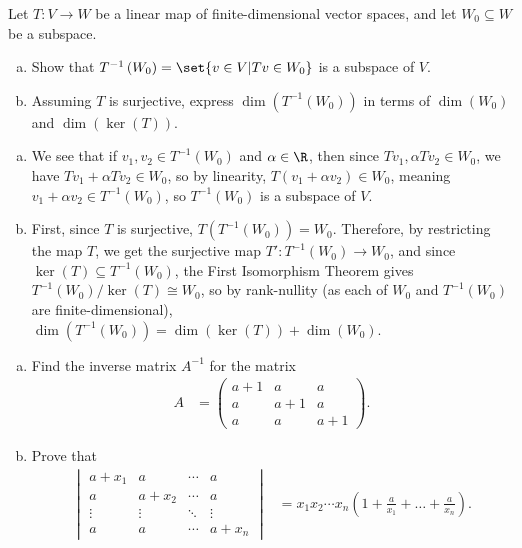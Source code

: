\documentclass[10pt]{mypackage}
\begin{document}
\begin{problem}
  Let $T\colon V\rightarrow W$ be a linear map of finite-dimensional vector spaces, and let $W_0\subseteq W$ be a subspace.
  \begin{enumerate}[(a)]
    \item Show that $T^{-1}\left( W_0 \right) = \set{v\in V | Tv\in W_0}$ is a subspace of $V$.
    \item Assuming $T$ is surjective, express $\dim \left( T^{-1}\left( W_0 \right) \right)$ in terms of $\dim\left( W_0 \right)$ and $\dim\left( \ker\left( T \right) \right)$.
  \end{enumerate}
\end{problem}
\begin{solution}\hfill
  \begin{enumerate}[(a)]
    \item We see that if $v_1,v_2\in T^{-1}\left( W_0 \right)$ and $\alpha\in\R$, then since $Tv_1,\alpha Tv_2\in W_0$, we have $Tv_1 + \alpha Tv_2 \in W_0$, so by linearity, $T\left( v_1 + \alpha v_2 \right)\in W_0$, meaning $v_1 + \alpha v_2\in T^{-1}\left( W_0 \right)$, so $T^{-1}\left( W_0 \right)$ is a subspace of $V$.
    \item First, since $T$ is surjective, $T\left( T^{-1}\left( W_0 \right) \right) = W_0$. Therefore, by restricting the map $T$, we get the surjective map $T'\colon T^{-1}\left( W_0 \right)\rightarrow W_0$, and since $\ker\left( T \right)\subseteq T^{-1}\left( W_0 \right)$, the First Isomorphism Theorem gives $T^{-1}\left( W_0 \right)/\ker\left( T \right)\cong W_0$, so by rank-nullity (as each of $W_0$ and $T^{-1}\left( W_0 \right)$ are finite-dimensional), $\dim\left( T^{-1}\left( W_0 \right) \right) = \dim\left( \ker\left( T \right) \right) + \dim\left( W_0 \right)$.
  \end{enumerate}
\end{solution}
\begin{problem}[Problem 5]\hfill
  \begin{enumerate}[(a)]
    \item Find the inverse matrix $A^{-1}$ for the matrix
      \begin{align*}
        A &= \begin{pmatrix}a+1 & a & a \\ a & a+1 & a \\ a & a & a+1\end{pmatrix}.
      \end{align*}
    \item Prove that
      \begin{align*}
        \begin{vmatrix}a + x_1 & a & \cdots & a \\ a & a + x_2 & \cdots & a \\ \vdots & \vdots & \ddots & \vdots \\ a & a & \cdots & a + x_n\end{vmatrix} &= x_1x_2\cdots x_n\left( 1 + \frac{a}{x_1} + \dots + \frac{a}{x_n} \right).
      \end{align*}
  \end{enumerate}
\end{problem}
\end{document}
